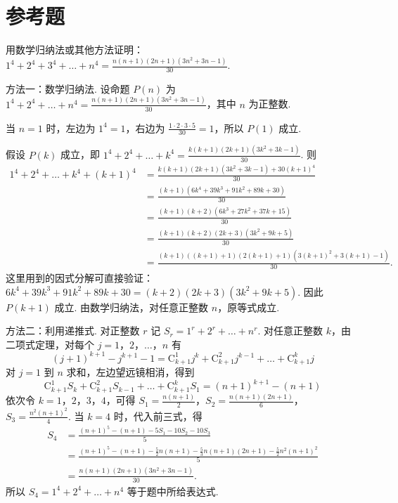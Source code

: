 \section{参考题}

\begin{problem}
用数学归纳法或其他方法证明：\(1^4+2^4+3^4+\dots+n^4=\frac{n(n+1)(2n+1)(3n^2+3n-1)}{30}\).
\end{problem}

\begin{solution}
方法一：数学归纳法. 设命题 \(P(n)\) 为
\(1^4+2^4+\dots+n^4=\frac{n(n+1)(2n+1)(3n^2+3n-1)}{30}\)，其中 \(n\) 为正整数.

当 \(n=1\) 时，左边为 \(1^4=1\)，右边为
\(\frac{1\cdot2\cdot3\cdot5}{30}=1\)，所以 \(P(1)\) 成立.

假设 \(P(k)\) 成立，即
\(1^4+2^4+\dots+k^4=\frac{k(k+1)(2k+1)(3k^2+3k-1)}{30}\). 则
\[
\begin{aligned}
1^4+2^4+\dots+k^4+(k+1)^4
&=\frac{k(k+1)(2k+1)(3k^2+3k-1)+30(k+1)^4}{30}\\
&=\frac{(k+1)(6k^4+39k^3+91k^2+89k+30)}{30}\\
&=\frac{(k+1)(k+2)(6k^3+27k^2+37k+15)}{30}\\
&=\frac{(k+1)(k+2)(2k+3)(3k^2+9k+5)}{30}\\
&=\frac{(k+1)((k+1)+1)(2(k+1)+1)\left(3(k+1)^2+3(k+1)-1\right)}{30}.
\end{aligned}
\]
这里用到的因式分解可直接验证：
\(6k^4+39k^3+91k^2+89k+30=(k+2)(2k+3)(3k^2+9k+5)\). 因此 \(P(k+1)\) 成立. 由数学归纳法，对任意正整数 \(n\)，原等式成立.

方法二：利用递推式. 对正整数 \(r\) 记 \(S_r=1^r+2^r+\dots+n^r\). 对任意正整数 \(k\)，由二项式定理，对每个 \(j=1\)，\(2\)，\(\dots\)，\(n\) 有
\[
(j+1)^{k+1}-j^{k+1}-1
=\mathrm C_{k+1}^1j^k+\mathrm C_{k+1}^2j^{k-1}+\dots+\mathrm C_{k+1}^kj
\]
对 \(j=1\) 到 \(n\) 求和，左边望远镜相消，得到
\[
\mathrm C_{k+1}^1S_k+\mathrm C_{k+1}^2S_{k-1}+\dots+\mathrm C_{k+1}^kS_1
=(n+1)^{k+1}-(n+1)
\]
依次令 \(k=1\)，\(2\)，\(3\)，\(4\)，可得
\(S_1=\frac{n(n+1)}2\)，\(S_2=\frac{n(n+1)(2n+1)}6\)，\(S_3=\frac{n^2(n+1)^2}{4}\).
当 \(k=4\) 时，代入前三式，得
\[
\begin{aligned}
S_4
&=\frac{(n+1)^5-(n+1)-5S_1-10S_2-10S_3}{5}\\
&=\frac{(n+1)^5-(n+1)-\frac52n(n+1)-\frac53n(n+1)(2n+1)-\frac52n^2(n+1)^2}{5}\\
&=\frac{n(n+1)(2n+1)(3n^2+3n-1)}{30}.
\end{aligned}
\]
所以 \(S_4=1^4+2^4+\dots+n^4\) 等于题中所给表达式.
\end{solution}

